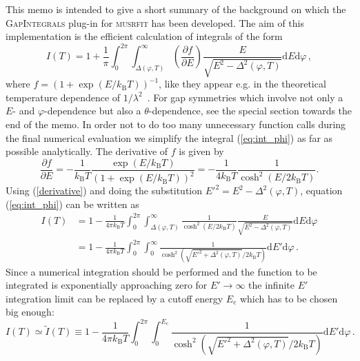 \documentclass[twoside]{article}
\newcommand{\musrfit}{\textsc{musrfit}\xspace}
\newcommand{\gapint}{\textsc{GapIntegrals}\xspace}
\begin{document}
This memo is intended to give a short summary of the background on which the \gapint plug-in for \musrfit \cite{musrfit} has been developed. The aim of this implementation is the efficient calculation of integrals of the form
\begin{equation}\label{eq:int_phi}
 I(T) = 1 + \frac{1}{\pi}\int_0^{2\pi}\int_{\Delta(\varphi,T)}^{\infty}\left(\frac{\partial f}{\partial E}\right) \frac{E}{\sqrt{E^2-\Delta^2(\varphi,T)}}\mathrm{d}E\mathrm{d}\varphi\,,
\end{equation}
where $f = (1+\exp(E/k_{\mathrm B}T))^{-1}$, like they appear e.g. in the theoretical temperature dependence of $1/\lambda^2$~\cite{Manzano}.
For gap symmetries which involve not only a $E$- and $\varphi$-dependence but also a $\theta$-dependence, see the special section towards the end of the memo.
In order not to do too many unnecessary function calls during the final numerical evaluation we simplify the integral (\ref{eq:int_phi}) as far as possible analytically. The derivative of $f$ is given by
\begin{equation}\label{derivative}
\frac{\partial f}{\partial E} = -\frac{1}{k_{\mathrm B}T}\frac{\exp(E/k_{\mathrm B}T)}{\left(1+\exp(E/k_{\mathrm B}T)\right)^2} = -\frac{1}{4k_{\mathrm B}T} \frac{1}{\cosh^2\left(E/2k_{\mathrm B}T\right)}.
\end{equation}
Using (\ref{derivative}) and doing the substitution $E'^2 = E^2-\Delta^2(\varphi,T)$, equation (\ref{eq:int_phi}) can be written as
\begin{equation}
\begin{split}
I(T) & = 1 - \frac{1}{4\pi k_{\mathrm B}T}\int_0^{2\pi}\int_{\Delta(\varphi,T)}^{\infty}\frac{1}{\cosh^2\left(E/2k_{\mathrm B}T\right)}\frac{E}{\sqrt{E^2-\Delta^2(\varphi,T)}}\mathrm{d}E\mathrm{d}\varphi \\
& = 1 - \frac{1}{4\pi k_{\mathrm B}T}\int_0^{2\pi}\int_{0}^{\infty}\frac{1}{\cosh^2\left(\sqrt{E'^2+\Delta^2(\varphi,T)}/2k_{\mathrm B}T\right)}\mathrm{d}E'\mathrm{d}\varphi\,.
\end{split}
\end{equation}
Since a numerical integration should be performed and the function to be integrated is exponentially approaching zero for $E'\rightarrow\infty$ the infinite $E'$ integration limit can be replaced by a cutoff energy $E_{\mathrm c}$ which has to be chosen big enough:
\begin{equation}
I(T) \simeq \tilde{I}(T) \equiv 1 - \frac{1}{4\pi k_{\mathrm B}T}\int_0^{2\pi}\int_{0}^{E_{\mathrm c}}\frac{1}{\cosh^2\left(\sqrt{E'^2+\Delta^2(\varphi,T)}/2k_{\mathrm B}T\right)}\mathrm{d}E'\mathrm{d}\varphi\,.
\end{equation}
\end{document}
